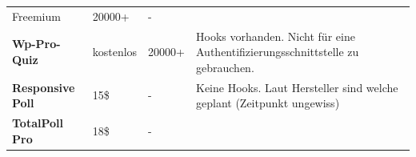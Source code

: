 \begin{longtable}[c]{@{}llll@{}}
\begin{minipage}[t]{0.12\columnwidth}\raggedright\strut
Freemium
\strut\end{minipage} &
\begin{minipage}[t]{0.20\columnwidth}\raggedright\strut
20000+
\strut\end{minipage} &
\begin{minipage}[t]{0.33\columnwidth}\raggedright\strut
-
\strut\end{minipage}\tabularnewline
\begin{minipage}[t]{0.24\columnwidth}\raggedright\strut
\textbf{Wp-Pro-Quiz}
\strut\end{minipage} &
\begin{minipage}[t]{0.12\columnwidth}\raggedright\strut
kostenlos
\strut\end{minipage} &
\begin{minipage}[t]{0.20\columnwidth}\raggedright\strut
20000+
\strut\end{minipage} &
\begin{minipage}[t]{0.33\columnwidth}\raggedright\strut
Hooks vorhanden. Nicht für eine Authentifizierungsschnittstelle zu
gebrauchen.
\strut\end{minipage}\tabularnewline
\begin{minipage}[t]{0.24\columnwidth}\raggedright\strut
\textbf{Responsive Poll}
\strut\end{minipage} &
\begin{minipage}[t]{0.12\columnwidth}\raggedright\strut
15\$
\strut\end{minipage} &
\begin{minipage}[t]{0.20\columnwidth}\raggedright\strut
-
\strut\end{minipage} &
\begin{minipage}[t]{0.33\columnwidth}\raggedright\strut
Keine Hooks. Laut Hersteller sind welche geplant (Zeitpunkt ungewiss)
\strut\end{minipage}\tabularnewline
\begin{minipage}[t]{0.24\columnwidth}\raggedright\strut
\textbf{TotalPoll Pro}
\strut\end{minipage} &
\begin{minipage}[t]{0.12\columnwidth}\raggedright\strut
18\$
\strut\end{minipage} &
\begin{minipage}[t]{0.20\columnwidth}\raggedright\strut
-
\strut\end{minipage} &
\begin{minipage}[t]{0.33\columnwidth}\raggedright\strut

\end{minipage}
\end{longtable}

